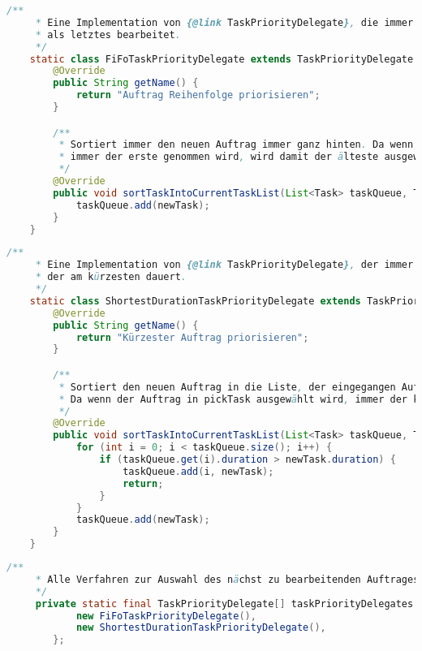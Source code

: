 \documentclass[a4paper,10pt,ngerman]{scrartcl}
\begin{document}
\newpage
\begin{lstlisting}[frame=single,language=Java,title=Klasse FiFoTaskPriorityDelegate,breaklines=true]
    /**
     * Eine Implementation von {@link TaskPriorityDelegate}, die immer den Auftrag der als neuestes eingegangen ist,
     * als letztes bearbeitet.
     */
    static class FiFoTaskPriorityDelegate extends TaskPriorityDelegate {
        @Override
        public String getName() {
            return "Auftrag Reihenfolge priorisieren";
        }

        /**
         * Sortiert immer den neuen Auftrag immer ganz hinten. Da wenn der Auftrag in pickTask ausgewählt wird,
         * immer der erste genommen wird, wird damit der älteste ausgewählt.
         */
        @Override
        public void sortTaskIntoCurrentTaskList(List<Task> taskQueue, Task newTask) {
            taskQueue.add(newTask);
        }
    }
	\end{lstlisting}
\begin{lstlisting}[frame=single,language=Java,title=Klasse ShortestDurationTaskPriorityDelegate,breaklines=true]
	/**
     * Eine Implementation von {@link TaskPriorityDelegate}, der immer den Auftrag als nächstes bearbeitet,
     * der am kürzesten dauert.
     */
    static class ShortestDurationTaskPriorityDelegate extends TaskPriorityDelegate {
        @Override
        public String getName() {
            return "Kürzester Auftrag priorisieren";
        }

        /**
         * Sortiert den neuen Auftrag in die Liste, der eingegangen Aufträge, ein, nach absteigender Dauer.
         * Da wenn der Auftrag in pickTask ausgewählt wird, immer der kürzeste genommen wird.
         */
        @Override
        public void sortTaskIntoCurrentTaskList(List<Task> taskQueue, Task newTask) {
            for (int i = 0; i < taskQueue.size(); i++) {
                if (taskQueue.get(i).duration > newTask.duration) {
                    taskQueue.add(i, newTask);
                    return;
                }
            }
            taskQueue.add(newTask);
        }
    }
	\end{lstlisting}
\begin{lstlisting}[frame=single,language=Java,title=Konstante taskPriorityDelegates,breaklines=true]
	/**
     * Alle Verfahren zur Auswahl des nächst zu bearbeitenden Auftrages.
     */
     private static final TaskPriorityDelegate[] taskPriorityDelegates = new TaskPriorityDelegate[]{
            new FiFoTaskPriorityDelegate(),
            new ShortestDurationTaskPriorityDelegate(),
    	};
	\end{lstlisting}
\end{document}
